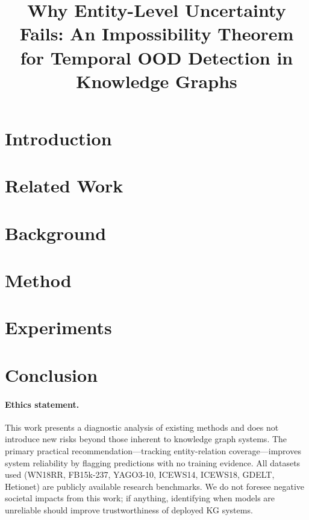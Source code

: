\documentclass{article}
\title{Why Entity-Level Uncertainty Fails: An Impossibility Theorem for Temporal OOD Detection in Knowledge Graphs}
\author{}
\begin{document}
\maketitle

\begin{abstract}
\begingroup\sloppy

\endgroup
\end{abstract}

\section{Introduction}
\label{sec:intro}
\begingroup\sloppy

\endgroup

\section{Related Work}
\label{sec:related}
\begingroup\sloppy

\endgroup

\section{Background}
\label{sec:background}
\begingroup\sloppy

\endgroup

\section{Method}
\label{sec:method}
\begingroup\sloppy

\endgroup

\section{Experiments}
\label{sec:experiments}
\begingroup\sloppy

\endgroup

\section{Conclusion}
\label{sec:conclusion}



\paragraph{Ethics statement.}
This work presents a diagnostic analysis of existing methods and does not introduce new risks beyond those inherent to knowledge graph systems. The primary practical recommendation---tracking entity-relation coverage---improves system reliability by flagging predictions with no training evidence. All datasets used (WN18RR, FB15k-237, YAGO3-10, ICEWS14, ICEWS18, GDELT, Hetionet) are publicly available research benchmarks. We do not foresee negative societal impacts from this work; if anything, identifying when models are unreliable should improve trustworthiness of deployed KG systems.
\end{document}
